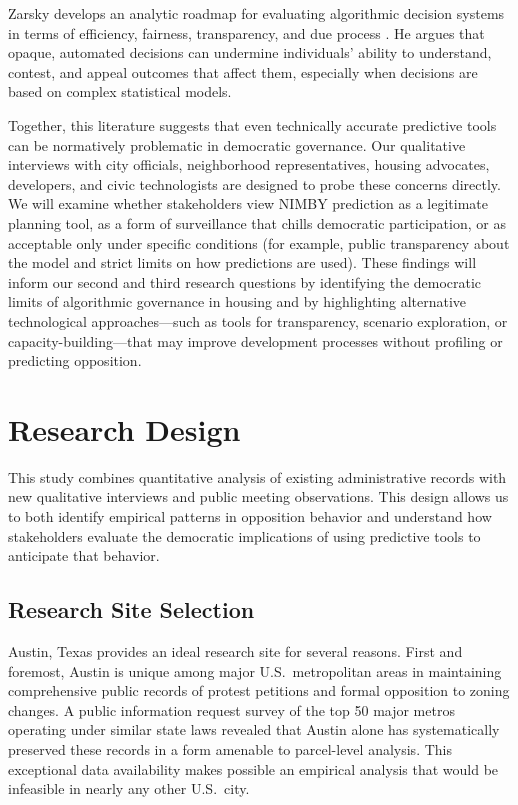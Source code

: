 \documentclass[12pt]{article}
\begin{document}
Zarsky develops an analytic roadmap for evaluating algorithmic decision systems in terms of efficiency, fairness, transparency, and due process \autocite{zarsky2016}. He argues that opaque, automated decisions can undermine individuals' ability to understand, contest, and appeal outcomes that affect them, especially when decisions are based on complex statistical models.

Together, this literature suggests that even technically accurate predictive tools can be normatively problematic in democratic governance. Our qualitative interviews with city officials, neighborhood representatives, housing advocates, developers, and civic technologists are designed to probe these concerns directly. We will examine whether stakeholders view NIMBY prediction as a legitimate planning tool, as a form of surveillance that chills democratic participation, or as acceptable only under specific conditions (for example, public transparency about the model and strict limits on how predictions are used). These findings will inform our second and third research questions by identifying the democratic limits of algorithmic governance in housing and by highlighting alternative technological approaches---such as tools for transparency, scenario exploration, or capacity-building---that may improve development processes without profiling or predicting opposition.


\section{Research Design}

This study combines quantitative analysis of existing administrative records with new qualitative interviews and public meeting observations. This design allows us to both identify empirical patterns in opposition behavior and understand how stakeholders evaluate the democratic implications of using predictive tools to anticipate that behavior.

\subsection{Research Site Selection}

Austin, Texas provides an ideal research site for several reasons. First and foremost, Austin is unique among major U.S.\ metropolitan areas in maintaining comprehensive public records of protest petitions and formal opposition to zoning changes. A public information request survey of the top 50 major metros operating under similar state laws revealed that Austin alone has systematically preserved these records in a form amenable to parcel-level analysis. This exceptional data availability makes possible an empirical analysis that would be infeasible in nearly any other U.S.\ city.
\end{document}
